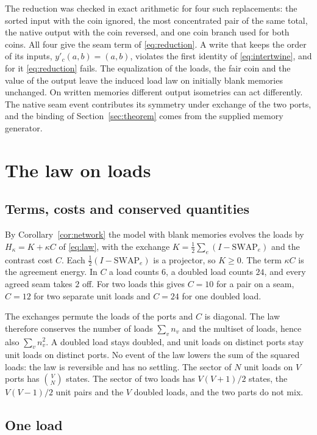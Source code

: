\documentclass[11pt]{article}
\theoremstyle{definition}
\theoremstyle{remark}
\theoremstyle{plain}
\newcommand{\SWAP}{\mathrm{SWAP}}
\begin{document}
The reduction was checked in exact arithmetic for four such replacements:
the sorted input with the coin ignored, the most concentrated pair of the
same total, the native output with the coin reversed, and one coin branch
used for both coins. All four give the seam term of \eqref{eq:reduction}.
A write that keeps the order of its inputs, $y'_c(a,b)=(a,b)$, violates the
first identity of \eqref{eq:intertwine}, and for it \eqref{eq:reduction}
fails. The equalization of the loads, the fair coin and the value of the
output leave the induced load law on initially blank memories unchanged. On written memories different output isometries can act differently. The native seam event contributes its symmetry under exchange of
the two ports, and the binding of Section~\ref{sec:theorem} comes from the
supplied memory generator.


\section{The law on loads}
\label{sec:loads}

\subsection{Terms, costs and conserved quantities}

By Corollary~\ref{cor:network} the model with blank memories evolves the
loads by $H_\kappa=K+\kappa C$ of \eqref{eq:law}, with the exchange
$K=\tfrac12\sum_e(I-\SWAP_e)$ and the contrast cost $C$. Each
$\tfrac12(I-\SWAP_e)$ is a projector, so $K\ge0$. The term $\kappa C$ is
the agreement energy. In $C$ a load counts $6$, a doubled load counts $24$,
and every agreed seam takes $2$ off. For two loads this gives $C=10$ for a
pair on a seam, $C=12$ for two separate unit loads and $C=24$ for one
doubled load.

The exchanges permute the loads of the ports and $C$ is diagonal. The law
therefore conserves the number of loads $\sum_vn_v$ and the multiset of
loads, hence also $\sum_vn_v^{2}$. A doubled load stays doubled, and unit
loads on distinct ports stay unit loads on distinct ports. No event of the
law lowers the sum of the squared loads: the law is reversible and has no
settling. The sector of $N$ unit loads on $V$ ports has $\binom VN$ states.
The sector of two loads has $V(V+1)/2$ states, the $V(V-1)/2$ unit pairs and
the $V$ doubled loads, and the two parts do not mix.

\subsection{One load}
\end{document}
